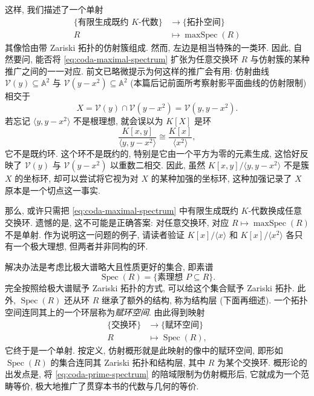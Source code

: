 这样, 我们描述了一个单射
\begin{equation}\label{eq:coda-maximal-spectrum}
  \begin{aligned}
    \{\text{有限生成既约 }K\text{-代数}\}&\to\{\text{拓扑空间}\}\\
    R&\mapsto\operatorname{maxSpec}(R)
  \end{aligned}
\end{equation}
其像恰由带 Zariski 拓扑的仿射簇组成. 然而, 左边是相当特殊的一类环. 因此, 自然要问, 能否将 \eqref{eq:coda-maximal-spectrum} 扩张为任意交换环 $R$ 与仿射簇的某种推广之间的一一对应. 前文已略微提示为何这样的推广会有用: 仿射曲线 $\mathcal{V}(y)\subseteq\mathbb{A}^{2}$ 与 $\mathcal{V}(y-x^{2})\subseteq\mathbb{A}^{2}$ (本篇后记前面所考察射影平面曲线的仿射限制) 相交于
\[
  X=\mathcal{V}(y)\cap\mathcal{V}(y-x^{2})=\mathcal{V}(y,y-x^{2}).
\]
若忘记 $\langle y,y-x^{2}\rangle$ 不是根理想, 就会误以为 $K[X]$ 是环
\[
  \frac{K[x,y]}{\langle y,y-x^{2}\rangle}\cong\frac{K[x]}{\langle x^{2}\rangle},
\]
它不是既约环. 这个环不是既约的, 特别是它由一个平方为零的元素生成, 这恰好反映了 $\mathcal{V}(y)$ 与 $\mathcal{V}(y-x^{2})$ 以\textquotedbl{}重数二\textquotedbl{}相交. 因此, 虽然 $K[x,y]/\langle y,y-x^{2}\rangle$ 不是簇 $X$ 的坐标环, 却可以尝试将它视为对 $X$ 的某种加强的坐标环, 这种加强记录了 $X$ 原本是一个切点这一事实.

那么, 或许只需把 \eqref{eq:coda-maximal-spectrum} 中有限生成既约 $K$-代数换成任意交换环. 遗憾的是, 这不可能是正确答案: 对任意交换环, 对应 $R\mapsto\operatorname{maxSpec}(R)$ 不是单射. 作为说明这一问题的例子, 请读者验证 $K[x]/\langle x\rangle$ 和 $K[x]/\langle x^{2}\rangle$ 各只有一个极大理想, 但两者并非同构的环.

解决办法是考虑比极大谱略大且性质更好的集合, 即素谱
\[
  \operatorname{Spec}(R)=\{\text{素理想 }P\subseteq R\}.
\]
完全按照给极大谱赋予 Zariski 拓扑的方式, 可以给这个集合赋予 Zariski 拓扑. 此外, $\operatorname{Spec}(R)$ 还从环 $R$ 继承了额外的结构, 称为\textquotedbl{}结构层\textquotedbl{} (下面再细述). 一个拓扑空间连同其上的一个环层称为\emph{赋环空间}. 由此得到映射
\begin{equation}\label{eq:coda-prime-spectrum}
  \begin{aligned}
    \{\text{交换环}\}&\to\{\text{赋环空间}\}\\
    R&\mapsto\operatorname{Spec}(R),
  \end{aligned}
\end{equation}
它终于是一个单射. 按定义, 仿射概形就是此映射的像中的赋环空间, 即形如 $\operatorname{Spec}(R)$ 的集合连同其 Zariski 拓扑和结构层, 其中 $R$ 为某个交换环. 概形论的出发点是, 将 \eqref{eq:coda-prime-spectrum} 的陪域限制为仿射概形后, 它就成为一个范畴等价, 极大地推广了贯穿本书的代数与几何的等价.


